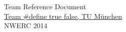 \documentclass[10pt,landscape,a4paper]{article}
\makeatletter
\renewcommand{\section}{\@startsection{section}{1}{0mm}%
                                {-1ex plus -.5ex minus -.2ex}%
                                {0.5ex plus .2ex}%
                                {\normalfont\large\bfseries}}
\makeatother
\begin{document}
\raggedright
\footnotesize
\begin{multicols}{2}


\setlength{\premulticols}{1pt}
\setlength{\postmulticols}{1pt}
\setlength{\multicolsep}{1pt}
\setlength{\columnsep}{2pt}

\begin{center}
     \Large{
     	Team Reference Document\\
     	\underline{Team \#define true false, TU M\"unchen}\\
     	NWERC 2014} \\
\end{center}

\tableofcontents


%

\scriptsize
%
%
\end{multicols}
\newpage
{}

\end{document}
